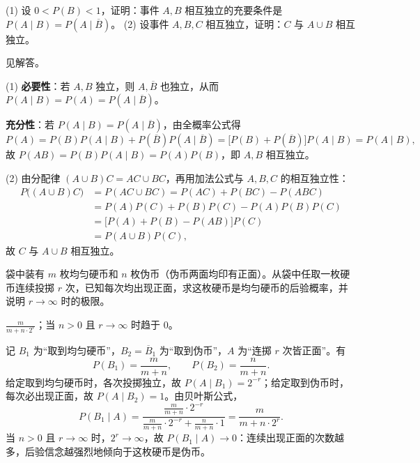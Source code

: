 \begin{exercise}[title={独立性的充要条件与组合保持性},level=advanced,points=10,tags={独立性,证明}]
(1) 设 $0<P(B)<1$，证明：事件 $A,B$ 相互独立的充要条件是 $P(A\mid B)=P(A\mid\overline{B})$。
(2) 设事件 $A,B,C$ 相互独立，证明：$C$ 与 $A\cup B$ 相互独立。
\begin{answer}
见解答。
\end{answer}
\begin{solution}
(1) \textbf{必要性}：若 $A,B$ 独立，则 $A,\overline{B}$ 也独立，从而 $P(A\mid B)=P(A)=P(A\mid\overline{B})$。

\textbf{充分性}：若 $P(A\mid B)=P(A\mid\overline{B})$，由全概率公式得
\[
  P(A)=P(B)P(A\mid B)+P(\overline{B})P(A\mid\overline{B})
  =\bigl[P(B)+P(\overline{B})\bigr]P(A\mid B)=P(A\mid B),
\]
故 $P(AB)=P(B)P(A\mid B)=P(A)P(B)$，即 $A,B$ 相互独立。

(2) 由分配律 $(A\cup B)C=AC\cup BC$，再用加法公式与 $A,B,C$ 的相互独立性：
\[
\begin{aligned}
  P\bigl((A\cup B)C\bigr)
  &=P(AC\cup BC)=P(AC)+P(BC)-P(ABC)\\
  &=P(A)P(C)+P(B)P(C)-P(A)P(B)P(C)\\
  &=\bigl[P(A)+P(B)-P(AB)\bigr]P(C)\\
  &=P(A\cup B)P(C),
\end{aligned}
\]
故 $C$ 与 $A\cup B$ 相互独立。
\end{solution}
\end{exercise}

\begin{exercise}[title={伪币识别的贝叶斯更新},level=advanced,points=10,tags={贝叶斯公式,独立性}]
袋中装有 $m$ 枚均匀硬币和 $n$ 枚伪币（伪币两面均印有正面）。从袋中任取一枚硬币连续投掷 $r$ 次，已知每次均出现正面，求这枚硬币是均匀硬币的后验概率，并说明 $r\to\infty$ 时的极限。
\begin{answer}
$\frac{m}{m+n\cdot 2^r}$；当 $n>0$ 且 $r\to\infty$ 时趋于 $0$。
\end{answer}
\begin{solution}
记 $B_1$ 为“取到均匀硬币”，$B_2=\overline{B}_1$ 为“取到伪币”，$A$ 为“连掷 $r$ 次皆正面”。有
\[
  P(B_1)=\frac{m}{m+n},\qquad P(B_2)=\frac{n}{m+n}.
\]
给定取到均匀硬币时，各次投掷独立，故 $P(A\mid B_1)=2^{-r}$；给定取到伪币时，每次必出现正面，故 $P(A\mid B_2)=1$。由贝叶斯公式，
\[
  P(B_1\mid A)
  =\frac{\frac{m}{m+n}\cdot 2^{-r}}{\frac{m}{m+n}\cdot 2^{-r}+\frac{n}{m+n}\cdot 1}
  =\frac{m}{m+n\cdot 2^r}.
\]
当 $n>0$ 且 $r\to\infty$ 时，$2^r\to\infty$，故 $P(B_1\mid A)\to 0$：连续出现正面的次数越多，后验信念越强烈地倾向于这枚硬币是伪币。
\end{solution}
\end{exercise}
